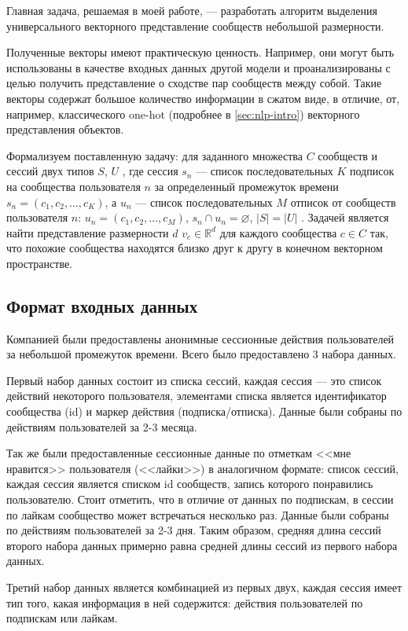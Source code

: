 \documentclass[times,specification,annotation]{itmo-student-thesis}
\begin{document}
Главная задача, решаемая в моей работе, --- разработать алгоритм выделения универсального векторного представление сообществ небольшой размерности. 

Полученные векторы имеют практическую ценность. Например, они могут быть использованы в
качестве входных данных другой модели и проанализированы с целью
получить представление о сходстве пар сообществ между собой. Такие векторы содержат большое количество информации в сжатом виде, в отличие, от, например, классического one-hot (подробнее в \ref{sec:nlp-intro}) векторного представления объектов.

Формализуем поставленную задачу: для заданного множества $C$ сообществ и сессий двух типов $S$, $U$ , где сессия $s_n$ --- список последовательных $K$ подписок на сообщества пользователя $n$ за определенный промежуток времени $s_n = (c_{1}, c_{2}, \dots, c_{K})$, а $u_n$ --- список последовательных $M$ отписок от сообществ пользователя $n$: $u_n = (c_{1},  c_{2}, \dots, c_{M})$, $s_n \cap u_n = \varnothing$, $|S| = |U|$ .  
Задачей является найти представление размерности $d$ $v_{c} \in \mathbb{R}^d$ для каждого сообщества $c \in C$ так, что похожие сообщества находятся близко друг к другу в конечном векторном пространстве. 

\subsection{Формат входных данных}

Компанией были предоставлены анонимные сессионные действия пользователей за небольшой промежуток времени. Всего было предоставлено 3 набора данных.

Первый набор данных состоит из списка сессий, каждая сессия --- это список действий некоторого пользователя, элементами списка является идентификатор сообщества (id) и маркер действия (подписка/отписка). Данные были собраны по действиям пользователей за 2-3 месяца.

Так же были предоставленные сессионные данные по отметкам <<мне нравится>> пользователя (<<лайки>>) в аналогичном формате: список сессий, каждая сессия является списком id сообществ, запись которого понравились пользователю. Стоит отметить, что в отличие от данных по подпискам, в сессии по лайкам сообщество может встречаться несколько раз. Данные были собраны по действиям пользователей за 2-3 дня. Таким образом, средняя длина сессий второго набора данных примерно равна средней длины сессий из первого набора данных. 

Третий набор данных является комбинацией из первых двух, каждая сессия имеет тип того, какая информация в ней содержится: действия пользователей по подпискам или лайкам. 
\end{document}
